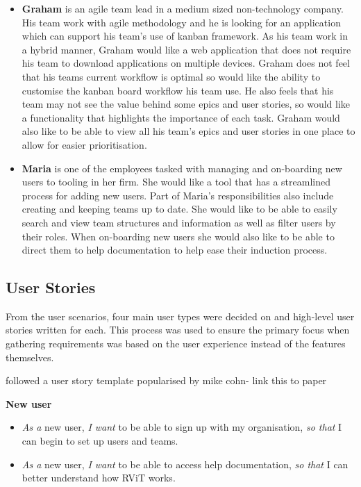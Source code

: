 \documentclass[l4proj.tex]{subfiles}
\begin{document}
\begin{itemize}
    \item \textbf{Graham} is an agile team lead in a medium sized non-technology company. His team work with agile methodology and he is looking for an application which can support his team's use of kanban framework. As his team work in a hybrid manner, Graham would like a web application that does not require his team to download applications on multiple devices. Graham does not feel that his teams current workflow is optimal so would like the ability to customise the kanban board workflow his team use. He also feels that his team may not see the value behind some epics and user stories, so would like a functionality that highlights the importance of each task. Graham would also like to be able to view all his team's epics and user stories in one place to allow for easier prioritisation. \\

    \item \textbf{Maria} is one of the employees tasked with managing and on-boarding new users to tooling in her firm. She would like a tool that has a streamlined process for adding new users. Part of Maria's responsibilities also include creating and keeping teams up to date. She would like to be able to easily search and view team structures and information as well as filter users by their roles. When on-boarding new users she would also like to be able to direct them to help documentation to help ease their induction process. 
\end{itemize}

\subsection{User Stories}
From the user scenarios, four main user types were decided on and high-level user stories written for each. This process was used to ensure the primary focus when gathering requirements was based on the user experience instead of the features themselves. 

followed a user story template popularised by mike cohn- link this to paper

\textbf{New user}
\begin{itemize}
    \item \textit{As a} new user, \textit{I want} to be able to sign up with my organisation, \textit{so that} I can begin to set up users and teams.
    \item \textit{As a} new user, \textit{I want} to be able to access help documentation, \textit{so that} I can better understand how RViT works.
\end{itemize}
\end{document}
